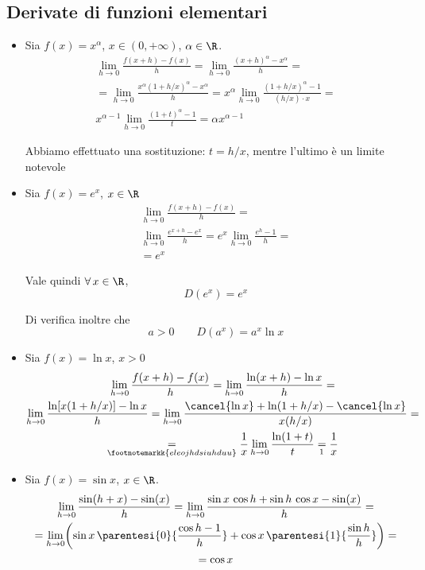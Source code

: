\subsection{Derivate di funzioni elementari}

\begin{itemize}
    \item Sia $ f(x)=x^{\alpha} $, $ x \in (0,+ \infty) $, $ \alpha \in \R $. \begin{multline*}
        \lim_{h\to 0} \frac{f(x+h)-f(x)}{h} = \lim_{h\to 0} \frac{(x+h)^{\alpha}-x^{\alpha}}{h} =\\
        = \lim_{h\to 0} \frac{x^{\alpha}(1+h/x)^{\alpha}-x^{\alpha}}{h} = x^{\alpha}\lim_{h\to 0} \frac{(1+h/x)^{\alpha}-1}{(h/x) \cdot x} = \\
        x^{\alpha-1} \lim_{h\to 0} \frac{(1+t)^{\alpha}-1}{t} = \alpha x^{\alpha-1}
    \end{multline*}
    
    Abbiamo effettuato una sostituzione: $ t=h/x $, mentre l'ultimo è un limite notevole %
    \item Sia $ f(x)=e^{x} $, $ x \in \R $\begin{multline*}
        \lim_{h\to 0} \frac{f(x+h)-f(x)}{h} = \\
        \lim_{h\to 0} \frac{e^{x+h}-e^{x}}{h} = e^{x} \lim_{h\to 0} \frac{e^{h}-1}{h} = \\
        = e^{x}
    \end{multline*}

    Vale quindi $ \forall\, x \in \R $, \begin{equation}
        D(e^{x})=e^{x}
    \end{equation}

    Di verifica inoltre che \begin{equation}
        a>0\qquad D(a^{x})=a^{x}\ln x
    \end{equation}
    \item Sia $ f(x)=\ln x $, $ x>0 $ \begin{multline*}
        \lim_{h\to 0} \frac{f(x+h)-f(x)}{h} = \lim_{h\to 0} \frac{\ln (x+h)-\ln x}{h} =\\
        \lim_{h\to 0} \frac{\ln [x(1+h/x)]-\ln x}{h}=\lim_{h\to 0} \frac{\cancel{\ln x} + \ln(1+h/x)-\cancel{\ln x}}{x(h/x)} =\\
        \underset{\footnotemarkk{eleojhdsiuhduu}}{=}\frac{1}{x} \lim_{h\to 0} \frac{\ln (1+t)}{t} \underset{\footnotemark}{=} \frac{1}{x}
    \end{multline*}
    \item Sia $ f(x)=\sin x $, $ x \in \R $.\begin{multline}
        \lim_{h\to 0} \frac{\sin(h+x)-\sin(x)}{h} = \lim_{h\to 0} \frac{\sin x \,\cos h + \sin h\,\cos x-\sin(x)}{h} =\\
        = \lim_{h\to 0} \biggl( \sin x \,\parentesi{0}{\frac{\cos h -1}{h}} + \cos x\, \parentesi{1}{\frac{\sin h}{h}} \biggr)=\\
        = \cos x
    \end{multline}


\end{itemize}
